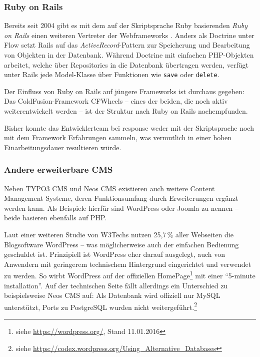 \subsubsection{Ruby on Rails}

Bereits seit 2004 gibt es mit dem auf der Skriptsprache Ruby basierenden \emph{Ruby on Rails} einen weiteren Vertreter der Webframeworks \cite[S. 1]{Orsini.2007}. Anders als Doctrine unter Flow setzt Rails auf das \emph{ActiveRecord}-Pattern zur Speicherung und Bearbeitung von Objekten in der Datenbank. Während Doctrine mit einfachen PHP-Objekten arbeitet, welche über Repositories in die Datenbank übertragen werden, verfügt unter Rails jede Model-Klasse über Funktionen wie \texttt{save} oder \texttt{delete}.

Der Einfluss von Ruby on Rails auf jüngere Frameworks ist durchaus gegeben: Das ColdFusion-Framework CFWheels -- eines der beiden, die noch aktiv weiterentwickelt werden -- ist der Struktur nach Ruby on Rails nachempfunden.

Bisher konnte das Entwicklerteam bei response weder mit der Skriptsprache noch mit dem Framework Erfahrungen sammeln, was vermutlich in einer hohen Einarbeitungsdauer resultieren würde.

\subsubsection{Andere erweiterbare CMS}

Neben TYPO3 CMS und Neos CMS existieren auch weitere Content Management Systeme, deren Funktionsumfang durch Erweiterungen ergänzt werden kann. Als Beispiele hierfür sind WordPress oder Joomla zu nennen -- beide basieren ebenfalls auf PHP.

Laut einer weiteren Studie von W3Techs nutzen 25,7\,\% aller Webseiten die Blogsoftware WordPress \cite{W3Techs.2016} -- was möglicherweise auch der einfachen Bedienung geschuldet ist. Prinzipiell ist WordPress eher darauf ausgelegt, auch von Anwendern mit geringerem technischem Hintergrund eingerichtet und verwendet zu werden. So wirbt WordPress auf der offiziellen HomePage\footnote{siehe \url{https://wordpress.org/}, Stand 11.01.2016} mit einer \enquote{5-minute installation}. Auf der technischen Seite fällt allerdings ein Unterschied zu beispielsweise Neos CMS auf: Als Datenbank wird offiziell nur MySQL unterstützt, Ports zu PostgreSQL wurden nicht weitergeführt.\footnote{siehe \url{https://codex.wordpress.org/Using\_Alternative\_Databases}}

